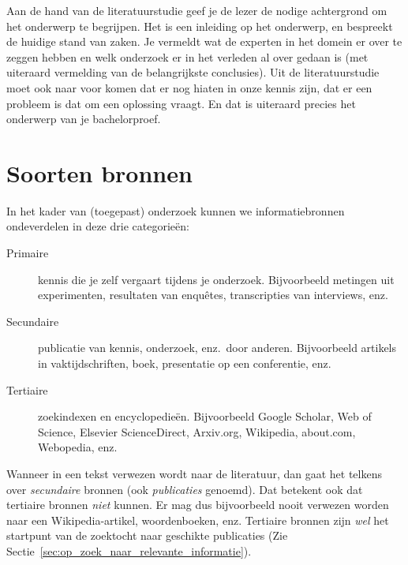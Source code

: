 Aan de hand van de literatuurstudie geef je de lezer de nodige achtergrond om het onderwerp te begrijpen. Het is een inleiding op het onderwerp, en bespreekt de huidige stand van zaken. Je vermeldt wat de experten in het domein er over te zeggen hebben en welk onderzoek er in het verleden al over gedaan is (met uiteraard vermelding van de belangrijkste conclusies). Uit de literatuurstudie moet ook naar voor komen dat er nog hiaten in onze kennis zijn, dat er een probleem is dat om een oplossing vraagt. En dat is uiteraard precies het onderwerp van je bachelorproef.

\section{Soorten bronnen}
\label{sec:soorten-bronnen}

In het kader van (toegepast) onderzoek kunnen we informatiebronnen ondeverdelen in deze drie categorieën:

\begin{description}
  \item[Primaire] kennis die je zelf vergaart tijdens je onderzoek. Bijvoorbeeld metingen uit experimenten, resultaten van enquêtes, transcripties van interviews, enz.
  \item[Secundaire] publicatie van kennis, onderzoek, enz.~door anderen. Bijvoorbeeld artikels in vaktijdschriften, boek, presentatie op een conferentie, enz.
  \item[Tertiaire] zoekindexen en encyclopedieën. Bijvoorbeeld Google Scholar, Web of Science, Elsevier ScienceDirect, Arxiv.org, Wikipedia, about.com, Webopedia, enz.
\end{description}

Wanneer in een tekst verwezen wordt naar de literatuur, dan gaat het telkens over \emph{secundaire} bronnen (ook \emph{publicaties} genoemd). Dat betekent ook dat tertiaire bronnen \emph{niet} kunnen. Er mag dus bijvoorbeeld nooit verwezen worden naar een Wikipedia-artikel, woordenboeken, enz. Tertiaire bronnen zijn \emph{wel} het startpunt van de zoektocht naar geschikte publicaties (Zie Sectie~\ref{sec:op_zoek_naar_relevante_informatie}).


